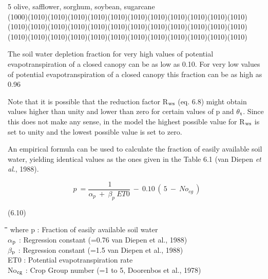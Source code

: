 \documentclass[11pt]{article}
\begin{document}
5  olive, safflower, sorghum, soybean, sugarcane\\
\GrBox(1000)\GrBox(1010)\GrBox(1010)\GrBox(1010)\GrBox(1010)\GrBox(1010)\GrBox(1010)\GrBox(1010)\GrBox(1010)\GrBox(1010)\GrBox(1010)\GrBox(1010)\GrBox(1010)\GrBox(1010)\GrBox(1010)\GrBox(1010)\GrBox(1010)\GrBox(1010)\GrBox(1010)\GrBox(1010)\GrBox(1010)\GrBox(1010)\GrBox(1010)\GrBox(1010)\GrBox(1010)\GrBox(1010)\GrBox(1010)\GrBox(1010)\GrBox(1010)\GrBox(1010)\GrBox(1010)\GrBox(1010)\GrBox(1010)\GrBox(1010)\GrBox(1010)\GrBox(1010)\-

The soil water depletion fraction for very high values of potential evapotranspir\-ation of a
closed canopy can be as low as 0.10. For very low values of potential evapotranspiration
of a closed canopy this fraction can be as high as 0.96 

\bigskip
Note that it is possible that the reduction factor R$_{{\rm ws}}$ (eq. 6.8) might obtain values higher
than unity and lower than zero for certain values of p and $\theta$$_{{\rm t}}$. Since this does not make
any sense, in the model the highest possible value for R$_{{\rm ws}}$ is set to unity and the lowest
possible value is set to zero.

 An empirical formula can be used to calculate the fraction of easily available soil water,
yielding identical values as the ones given in the Table 6.1 (van Diepen {\it et al\/}., 1988).

\begin{displaymath}
p~={\frac{~1}{ \alpha _{p} ~+~ \beta _{p} ~ET0}} ~-~ 0.10\, (\, 5~-~No _{cg} \, )
\end{displaymath}

 \bigskip
\strut\hfill (6.10)

\nwln
\begin{tabbing}
\hspace{1.27cm}\=\hspace{1.27cm}\=\hspace{1.27cm}\=\hspace{1.27cm}\=%
\hspace{1.27cm}\=\hspace{1.27cm}\=\hspace{1.27cm}\=\hspace{1.27cm}\=%
\hspace{1.27cm}\=\hspace{1.27cm}\=\kill
where\> p\> : Fraction of easily available soil water\> \> \> \> \> \> \> \> [cm$^{{\rm 3}}$ cm$^{{\rm -3}}$]\\
\>$\alpha$$_{{\rm p}}$\> : Regression constant {\small (=0.76 van Diepen et al., 1988)}\> \> \> \> \> \> \> \> [-]\\
\>$\beta$$_{{\rm p}}$\> : Regression constant {\small (=1.5 van Diepen et al., 1988)}\> \> \> \> \> \> \> \> [d cm-$^{{\rm 1}}$]\\
\>ET0\> : Potential evapotranspiration rate\> \> \> \> \> \> \> \> [cm d$^{{\rm -1}}$]\\
\>No$_{{\rm cg}}$\> : Crop Group number {\small (=1 to 5, Doorenbos et al., 1978)}\> \> \> \> \> \> \> \> [-]
\end{tabbing}
\end{document}
